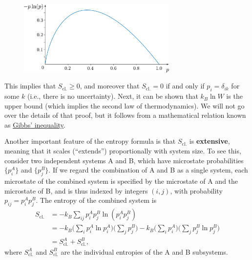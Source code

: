 \documentclass[pra,12pt]{revtex4}
\begin{document}
\begin{figure}[h]
  \centering\includegraphics[width=0.7\textwidth]{plogp}
\end{figure}

This implies that $S_{\mathrm{cl.}}\ge 0$, and moreover that
$S_{\mathrm{cl.}} = 0$ if and only if $p_i = \delta_{ik}$ for some $k$
(i.e., there is no uncertainty).  Next, it can be shown that $k_B \ln
W$ is the upper bound (which implies the second law of
thermodynamics).  We will not go over the details of that proof, but
it follows from a mathematical relation known as
\href{https://en.wikipedia.org/wiki/Gibbs\%27_inequality}{Gibbs'
  inequality}.

Another important feature of the entropy formula is that
$S_{\mathrm{cl.}}$ is \textbf{extensive}, meaning that it scales
(``extends'') proportionally with system size.  To see this, consider
two independent systems A and B, which have microstate probabilities
$\{p_i^A\}$ and $\{p_j^B\}$.  If we regard the combination of A and B
as a single system, each microstate of the combined system is
specified by the microstate of A and the microstate of B, and is thus
indexed by integers $(i,j)$, with probability $p_{ij} = p^A_ip^B_j$.
The entropy of the combined system is
$$\begin{aligned}S_{\mathrm{cl.}} &= - k_B \sum_{ij} p_i^Ap^B_j \ln\left(p^A_ip^B_j\right) \\
  &= - k_B \Big(\sum_{i} p^A_i \ln p^A_i\Big)\Big(\sum_j p^B_j\Big)
  - k_B \Big(\sum_{i} p^A_i \Big) \Big(\sum_j p^B_j \ln p^B_j\Big) \\
  &= S_{\mathrm{cl.}}^A + S_{\mathrm{cl.}}^B,
\end{aligned}$$
where $S_{\mathrm{cl.}}^A$ and $S_{\mathrm{cl.}}^B$ are the individual
entropies of the A and B subsystems.
\end{document}
